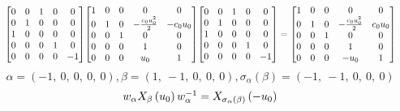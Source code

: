 \documentclass[11pt]{article}
\theoremstyle{definition}
\begin{document}
\[
\scaletoalign{\textwidth}{{\left[\begin{matrix}0 & 0 & 1 & 0 & 0\\0 & 1 & 0 & 0 & 0\\1 & 0 & 0 & 0 & 0\\0 & 0 & 0 & 1 & 0\\0 & 0 & 0 & 0 & -1\end{matrix}\right]} {\left[\begin{matrix}1 & 0 & 0 & 0 & 0\\0 & 1 & 0 & - \frac{c_{0} u_{0}^{2}}{2} & - c_{0} u_{0}\\0 & 0 & 1 & 0 & 0\\0 & 0 & 0 & 1 & 0\\0 & 0 & 0 & u_{0} & 1\end{matrix}\right]} {\left[\begin{matrix}0 & 0 & 1 & 0 & 0\\0 & 1 & 0 & 0 & 0\\1 & 0 & 0 & 0 & 0\\0 & 0 & 0 & 1 & 0\\0 & 0 & 0 & 0 & -1\end{matrix}\right]} = {\left[\begin{matrix}1 & 0 & 0 & 0 & 0\\0 & 1 & 0 & - \frac{c_{0} u_{0}^{2}}{2} & c_{0} u_{0}\\0 & 0 & 1 & 0 & 0\\0 & 0 & 0 & 1 & 0\\0 & 0 & 0 & - u_{0} & 1\end{matrix}\right]}}
\]
\[
\alpha = \left( -1, \  0, \  0, \  0, \  0\right), \beta = \left( 1, \  -1, \  0, \  0, \  0\right), \sigma_{\alpha}(\beta) = \left( -1, \  -1, \  0, \  0, \  0\right)
\]
\[
\scaletoalign{\textwidth}{w_{\alpha} X_{\beta}\left(u_{0}\right) w_{\alpha}^{-1} = X_{\sigma_{\alpha}\left(\beta\right)}\left(- u_{0}\right)}
\]
\end{document}
